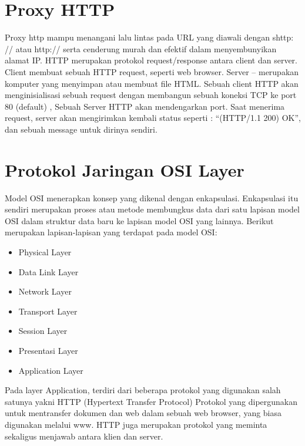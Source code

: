 \section{Proxy HTTP}
Proxy http mampu menangani lalu lintas pada URL yang diawali dengan shttp: // atau http:// serta cenderung murah dan efektif dalam menyembunyikan alamat IP. HTTP merupakan protokol request/response antara client dan server. Client membuat sebuah HTTP request, seperti web browser. Server – merupakan komputer yang menyimpan atau membuat file HTML. Sebuah client HTTP akan menginisialisasi sebuah request dengan membangun sebuah koneksi TCP ke port 80 (default) , Sebuah Server HTTP akan mendengarkan port. Saat menerima request, server akan mengirimkan kembali status seperti : “(HTTP/1.1 200) OK”, dan sebuah message untuk dirinya sendiri\cite{farhanah2011pengembangan}.

\section{Protokol Jaringan OSI Layer}
Model OSI menerapkan konsep yang dikenal dengan enkapsulasi. Enkapsulasi itu sendiri merupakan proses atau metode membungkus data dari satu lapisan model OSI dalam struktur data baru ke lapisan model OSI yang lainnya. Berikut merupakan lapisan-lapisan yang terdapat pada model OSI:
\begin{itemize}
\item Physical Layer
\item Data Link Layer
\item Network Layer
\item Transport Layer
\item Session Layer
\item Presentasi Layer
\item Application Layer
\end{itemize}
Pada layer Application, terdiri dari beberapa protokol yang digunakan salah satunya yakni HTTP (Hypertext Transfer Protocol) Protokol yang dipergunakan untuk mentransfer dokumen dan web dalam sebuah web browser, yang biasa digunakan melalui www. HTTP juga merupakan protokol yang meminta sekaligus menjawab antara klien dan server\cite{sujana2015perangkat}. 